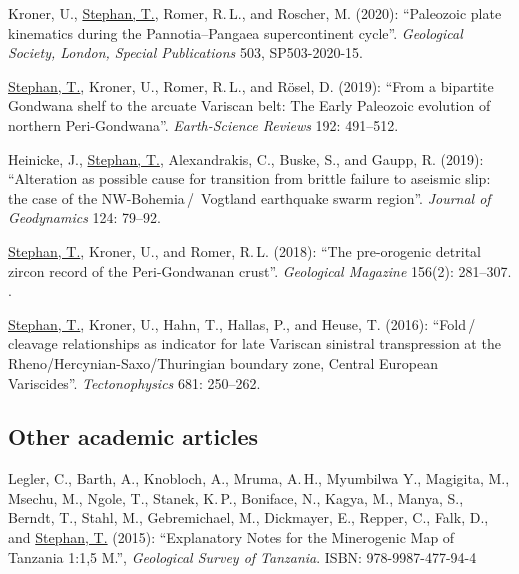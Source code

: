 \documentclass[10pt, paper=letter]{scrartcl} %
\begin{document}
\begin{cv}{}
\begin{cvlist}{}
        \item[5] Kroner, U., \ul{Stephan, T.}, Romer, R.\,L., and Roscher, M. (2020): \enquote{Paleozoic plate kinematics during the Pannotia--Pangaea supercontinent cycle}. \textit{Geological Society, London, Special Publications} 503, SP503-2020-15. 
        \item[4] \ul{Stephan, T.}, Kroner, U., Romer, R.\,L., and R\"osel, D. (2019): \enquote{From a bipartite Gondwana shelf to the arcuate Variscan belt: The Early Paleozoic evolution of northern Peri-Gondwana}. \textit{Earth-Science Reviews} 192: 491--512. 
        \item[3] Heinicke, J., \ul{Stephan, T.}, Alexandrakis, C., Buske, S., and Gaupp, R. (2019): \enquote{Alteration as possible cause for transition from brittle failure to aseismic slip: the case of the NW-Bohemia\,/\, Vogtland earthquake swarm region}. \textit{Journal of Geodynamics} 124: 79--92. 
        \item[2] \ul{Stephan, T.}, Kroner, U., and Romer, R.\,L. (2018): \enquote{The pre-orogenic detrital zircon record of the Peri-Gondwanan crust}. \textit{Geological Magazine} 156(2): 281--307. 
        .
        \item[1] \ul{Stephan, T.}, Kroner, U., Hahn, T., Hallas, P., and Heuse, T. (2016): \enquote{Fold\,/\,cleavage relationships as indicator for late Variscan sinistral transpression at the Rheno\-/Hercynian\--Saxo\-/Thuringian boundary zone, Central European Variscides}. \textit{Tectonophysics} 681: 250--262. 
    \end{cvlist}
    \endgroup

    \subsection{Other academic articles}
    \begingroup
    \setlength{\cvlabelwidth}{3em}
    \begin{cvlist}{}
        \item[Book] Legler, C., Barth, A., Knobloch, A., Mruma, A.\,H., Myumbilwa Y.,
        Magigita, M., Msechu, M., Ngole, T., Stanek, K.\,P., Boniface, N., Kagya, M.,
        Manya, S., Berndt, T., Stahl, M., Gebremichael, M., Dickmayer, E., Repper, C.,
        Falk, D., and \ul{Stephan, T.} (2015): \enquote{Explanatory Notes for the
            Minerogenic Map of Tanzania 1:1,5 M.}, \textit{Geological Survey of Tanzania}.
        ISBN: 978-9987-477-94-4
    \end{cvlist}
    \endgroup


\end{cv}
\end{document}
